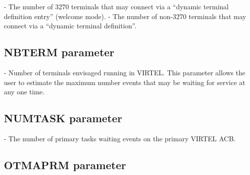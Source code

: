 \documentclass[letterpaper,10pt,english]{sphinxmanual}
\begin{document}
 - The number of 3270 terminals that may connect via a “dynamic terminal definition entry” (welcome mode).
 - The number of non-3270 terminals that may connect via a “dynamic terminal definition”.

\ignorespaces 

\subsection{NBTERM parameter}
\label{\detokenize{Installation_Guide:nbterm-parameter}}\label{\detokenize{Installation_Guide:index-95}}
\begin{sphinxVerbatim}[commandchars=\\\{\}]
 
\end{sphinxVerbatim}

 - Number of terminals envisaged running in VIRTEL. This parameter allows the user to estimate the maximum number events that may be waiting for service at any one time.

\ignorespaces 

\subsection{NUMTASK parameter}
\label{\detokenize{Installation_Guide:numtask-parameter}}\label{\detokenize{Installation_Guide:index-96}}
\begin{sphinxVerbatim}[commandchars=\\\{\}]
 
\end{sphinxVerbatim}

 - The number of primary tasks waiting events on the primary VIRTEL ACB.

\ignorespaces 

\subsection{OTMAPRM parameter}
\label{\detokenize{Installation_Guide:otmaprm-parameter}}\label{\detokenize{Installation_Guide:index-97}}
\begin{sphinxVerbatim}[commandchars=\\\{\}]
 
\end{sphinxVerbatim}
\end{document}
